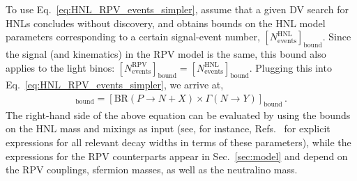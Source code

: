 \begin{itemize}
    To use Eq.~\eqref{eq:HNL_RPV_events_simpler}, assume that a given DV search for HNLs concludes without discovery, and obtains bounds on the HNL model parameters corresponding to a certain signal-event number, $[N_{\text{events}}^{\text{HNL}}]_{\text{bound}}$.
    Since the signal (and kinematics) in the RPV model is the same, this bound also applies to the light binos: $[N_{\text{events}}^{\text{RPV}}]_{\text{bound}} = [N_{\text{events}}^{\text{HNL}}]_{\text{bound}}$. Plugging this into Eq.~\eqref{eq:HNL_RPV_events_simpler}, we arrive at,
    \begin{align}
        [\text{BR}(P\to \tilde{\chi}^0_1+X') \times \Gamma(\tilde{\chi}^0_1\to Y)]_{\text{bound}}=[\text{BR}(P\to N+X) \times \Gamma(N\to Y)]_{\text{bound}}\,.
    \end{align}
    The right-hand side of the above equation can be evaluated by using the bounds on the HNL mass and mixings as input (see, for instance, Refs.~\cite{Shrock:1980ct, Gorbunov:2007ak, Bondarenko:2018ptm} for explicit expressions for all relevant decay widths in terms of these parameters), while the expressions for the RPV counterparts appear in Sec.~\ref{sec:model} and depend on the RPV couplings, sfermion masses, as well as the neutralino mass.
\end{itemize}
